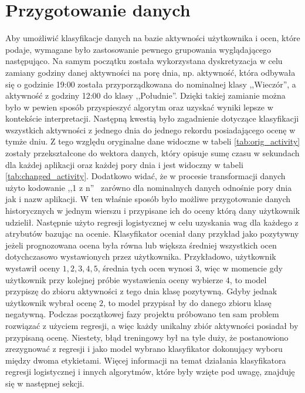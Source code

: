 \documentclass[a4paper,twoside,12pt]{book}
\begin{document}
\section{Przygotowanie danych}
\label{preparing}
Aby umożliwić klasyfikacje danych na bazie aktywności użytkownika i ocen, które podaje, wymagane było zastosowanie pewnego grupowania wyglądającego następująco. Na samym początku została wykorzystana dyskretyzacja w celu zamiany godziny danej aktywności na porę dnia, np. aktywność, która odbywała się o godzinie 19:00 została przyporządkowana do nominalnej klasy ,,Wieczór'', a aktywność z godziny 12:00 do klasy ,,Południe''. Dzięki takiej zamianie można było w pewien sposób przyspieszyć algorytm oraz uzyskać wyniki lepsze w kontekście interpretacji. Następną kwestią było zagadnienie dotyczące klasyfikacji wszystkich aktywności z jednego dnia do jednego rekordu posiadającego ocenę w tymże dniu. Z tego względu oryginalne dane widoczne w tabeli \ref{tab:orig_activity} zostały przekształcone do wektora danych, który opisuje sumę czasu w sekundach dla każdej aplikacji oraz każdej pory dnia i jest widoczny w tabeli \ref{tab:changed_activity}. Dodatkowo widać, że w procesie transformacji danych użyto kodowanie ,,1 z n''~\cite{one_hot_encoding} zarówno dla nominalnych danych odnośnie pory dnia jak i nazw aplikacji. W ten właśnie sposób było możliwe przygotowanie danych historycznych w jednym wierszu i przypisane ich do oceny którą dany użytkownik udzielił. Następnie użyto regresji logistycznej w celu uzyskania wag dla każdego z atrybutów bazując na ocenie. Klasyfikator oceniał dany przykład jako pozytywny jeżeli prognozowana ocena była równa lub większa średniej wszystkich ocen dotychczasowo wystawionych przez użytkownika. Przykładowo, użytkownik wystawił oceny $1, 2, 3, 4, 5$, średnia tych ocen wynosi $3$, więc w momencie gdy użytkownik przy kolejnej próbie wystawienia oceny wybierze $4$, to model przypiszę do zbioru aktywności z tego dnia klasę pozytywną. Gdyby jednak użytkownik wybrał ocenę $2$, to model przypisał by do danego zbioru klasę negatywną. Podczas początkowej fazy projektu próbowano ten sam problem rozwiązać z użyciem regresji, a więc każdy unikalny zbiór aktywności posiadał by przypisaną ocenę. Niestety, błąd treningowy był na tyle duży, że postanowiono zrezygnować z regresji i jako model wybrano klasyfikator dokonujący wyboru między dwoma etykietami. Więcej informacji na temat działania klasyfikatora regresji logistycznej i innych algorytmów, które były wzięte pod uwagę, znajduję się w następnej sekcji. 
\end{document}

